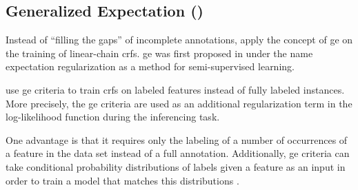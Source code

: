 \subsection{Generalized Expectation ()}

Instead of ``filling the gaps'' of incomplete annotations, \citet{mann2008generalized} apply the concept of \gls{ge} on the training of linear-chain \glspl{crf}.
\Gls{ge} was first proposed in \citet{mann2007simple} under the name \gls{expectation regularization} as a method for semi-supervised learning.

\citet{mann2008generalized} use \gls{ge} criteria to train \glspl{crf} on labeled features instead of fully labeled instances.
More precisely, the \gls{ge} criteria are used as an additional regularization term in the log-likelihood function during the inferencing task.

One advantage is that it requires only the labeling of a number of occurrences of a feature in the data set instead of a full annotation.
Additionally, \gls{ge} criteria can take \glspl{conditional probability distribution} of labels given a feature as an input in order to train a model that matches this distributions \citep{mann2008generalized}.

\bigskip

